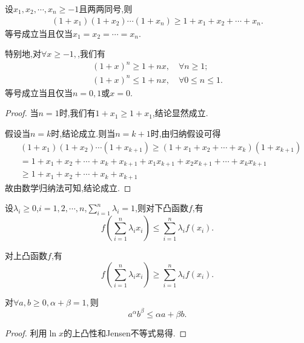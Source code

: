 \documentclass[../../main.tex]{subfiles}%
\begin{document}
\begin{theorem}[Bernoulli不等式]\label{theorem:Bernoulli不等式}
设$x_1,x_2,\cdots,x_n\geqslant  -1$且两两同号,则
\begin{align*}
\left( 1+x_1 \right) \left( 1+x_2 \right) \cdots \left( 1+x_n \right) \geqslant 1+x_1+x_2+\cdots +x_n.
\end{align*}
等号成立当且仅当$x_1=x_2=\cdots =x_n$.

特别地,对$\forall x\geqslant -1,$,我们有
\begin{gather*}
(1+x)^n\geqslant1+nx,\quad \forall n\geqslant 1;
\\
(1+x)^n\leqslant1+nx,\quad \forall 0\leqslant n\leqslant 1.
\end{gather*}
等号成立当且仅当$n=0,1$或$x=0$.
\end{theorem}
\begin{proof}
当$n=1$时,我们有$1+x_1\geqslant  1+x_1$,结论显然成立.

假设当$n=k$时,结论成立.则当$n=k+1$时,由归纳假设可得
\begin{align*}
&\left( 1+x_1 \right) \left( 1+x_2 \right) \cdots \left( 1+x_{k+1} \right) \geqslant \left( 1+x_1+x_2+\cdots +x_k \right) \left( 1+x_{k+1} \right) 
\\
&=1+x_1+x_2+\cdots +x_k+x_{k+1}+x_1x_{k+1}+x_2x_{k+1}+\cdots +x_kx_{k+1}
\\
&\geqslant 1+x_1+x_2+\cdots +x_k+x_{k+1}
\end{align*}
故由数学归纳法可知,结论成立.
\end{proof}

\begin{theorem}[Jensen不等式]\label{theorem:Jensen不等式}
设\(\lambda_i \geqslant  0\),\(i = 1,2,\cdots,n\),\(\sum\limits_{i = 1}^{n} \lambda_i = 1\),则对下凸函数\(f\),有
\[
f\left(\sum\limits_{i = 1}^{n} \lambda_i x_i\right) \leqslant  \sum\limits_{i = 1}^{n} \lambda_i f(x_i).
\]

对上凸函数\(f\),有
\[
f\left(\sum\limits_{i = 1}^{n} \lambda_i x_i\right) \geqslant  \sum\limits_{i = 1}^{n} \lambda_i f(x_i).
\]
\end{theorem}

\begin{corollary}
对$\forall a,b\geqslant 0,\alpha +\beta =1,$则
$$a^{\alpha}b^{\beta}\leqslant \alpha a+\beta b.$$
\end{corollary}
\begin{proof}
利用$\ln x$的上凸性和Jensen不等式易得.
\end{proof}
\end{document}
